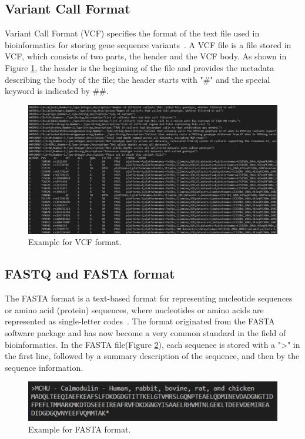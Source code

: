 \documentclass[PhD]{PHlab-thesis}
\begin{document}
\subsection{Variant Call Format}
Variant Call Format (VCF) specifies the format of the text file used in bioinformatics for storing gene sequence variants~\cite{Danecek2011VCF}. A VCF file is a file stored in VCF, which consists of two parts, the header and the VCF body. As shown in Figure \ref{fig:VCF format}, the header is the beginning of the file and provides the metadata describing the body of the file; the header starts with "\#" and the special keyword is indicated by \#\#.

\begin{figure}[h!]
	\centering
	\includegraphics[scale=0.3]{figures/Example for VCF file.png}
	\caption{Example for VCF format.}
	\label{fig:VCF format} %
\end{figure}

\subsection{FASTQ and FASTA format}
The FASTA format is a text-based format for representing nucleotide sequences or amino acid (protein) sequences, where nucleotides or amino acids are represented as single-letter codes~\cite{Lipman1985FASTA}. The format originated from the FASTA software package and has now become a very common standard in the field of bioinformatics. In the FASTA file(Figure \ref{fig:FASTA format}), each sequence is stored with a ">" in the first line, followed by a summary description of the sequence, and then by the sequence information.

\begin{figure}[h!]
	\centering
	\includegraphics[scale=0.4]{figures/Example for FASTA format.png}
	\caption{Example for FASTA format.}
	\label{fig:FASTA format} %
\end{figure}
\end{document}
